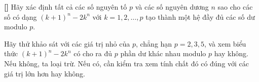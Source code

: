\documentclass[../05-modular-arithmetic-a.tex]{subfiles}
\begin{document}
\begin{exercise*}\label{example:HUN-2015-TST-KMA-640}\textbf{[]}
    Hãy xác định tất cả các số nguyên tố \( p \) và các số nguyên dương \( n \) sao cho các số có dạng \( (k+1)^n - 2k^n \)
    với \( k = 1, 2, \ldots, p \) tạo thành một hệ đầy đủ các số dư modulo \( p \).
\end{exercise*}

\begin{remark*}
    Hãy thử khảo sát với các giá trị nhỏ của \( p \), chẳng hạn \( p = 2, 3, 5 \), và xem biểu thức \( (k + 1)^n - 2k^n \) có cho ra đủ \( p \) phần dư khác nhau modulo \( p \) hay không.
    Nếu không, ta loại trừ. Nếu có, cần kiểm tra xem tính chất đó có đúng với các giá trị lớn hơn hay không.
\end{remark*}






\end{document}
